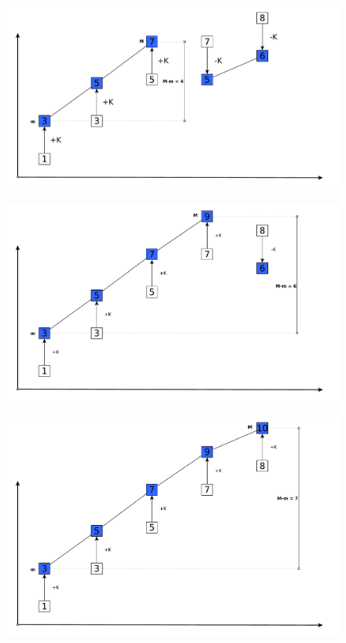 \begin{figure}
	\centering
	
		\includegraphics[width=1\linewidth]{sources/smallest_range/images/bars4}
		\caption{}
		\label{fig:smallest_range:bars4}
\end{figure}	

\begin{figure}
	\centering
	
		\includegraphics[width=1\linewidth]{sources/smallest_range/images/bars5}
		\caption{}
		\label{fig:smallest_range:bars5}
\end{figure}	

\begin{figure}
	\centering
	
		\includegraphics[width=1\linewidth]{sources/smallest_range/images/bars6}
		\caption{}
		\label{fig:smallest_range:bars6}
\end{figure}	



